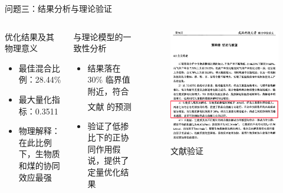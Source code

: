 \documentclass{beamer}
\newcommand{\upcite}[1]{\textsuperscript{\textsuperscript{ \cite{#1}}}}
\begin{document}
\begin{frame}{问题三：结果分析与理论验证}\
    \small
    \begin{columns}[T]
        \begin{block}{优化结果及其物理意义}
            \begin{itemize}
                \item 最佳混合比例：\alert{28.44\%}
                \item 最大量化指标：0.3511
                \item 物理解释：在此比例下，生物质和煤的协同效应最强
            \end{itemize}
        \end{block}
        \begin{block}{与理论模型的一致性分析}
            \begin{itemize}
                \item 结果落在 30\% 临界值附近，符合文献\upcite{ref12}的预测
                \item 验证了低掺比下的正协同作用假说，提供了定量优化结果
            \end{itemize}
        \end{block}
        \begin{figure}
        \centering
        \includegraphics[width=\textwidth]{pic/文献结论.png}
        \caption{文献验证\upcite{ref12}}
        \end{figure}
    \end{columns}
\end{frame}
\end{document}
